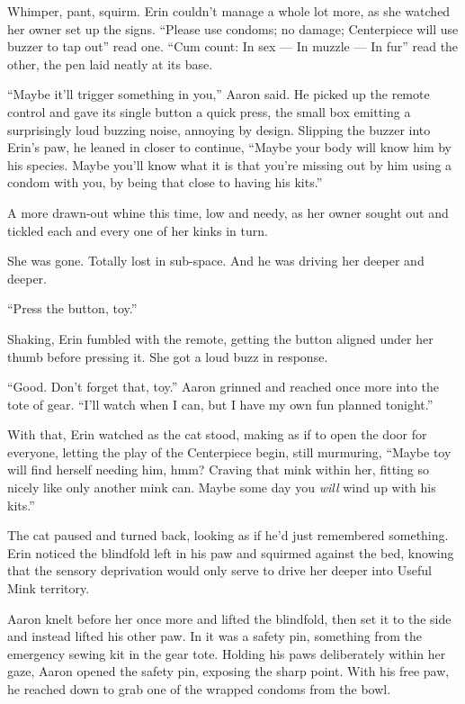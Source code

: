 Whimper, pant, squirm. Erin couldn't manage a whole lot more, as she
watched her owner set up the signs. ``Please use condoms; no damage;
Centerpiece will use buzzer to tap out'' read one. ``Cum count: In sex
--- In muzzle --- In fur'' read the other, the pen laid neatly at its
base.

``Maybe it'll trigger something in you,'' Aaron said. He picked up the
remote control and gave its single button a quick press, the small box
emitting a surprisingly loud buzzing noise, annoying by design. Slipping
the buzzer into Erin's paw, he leaned in closer to continue, ``Maybe
your body will know him by his species. Maybe you'll know what it is
that you're missing out by him using a condom with you, by being that
close to having his kits.''

A more drawn-out whine this time, low and needy, as her owner sought out
and tickled each and every one of her kinks in turn.

She was gone. Totally lost in sub-space. And he was driving her deeper
and deeper.

``Press the button, toy.''

Shaking, Erin fumbled with the remote, getting the button aligned under
her thumb before pressing it. She got a loud buzz in response.

``Good. Don't forget that, toy.'' Aaron grinned and reached once more
into the tote of gear. ``I'll watch when I can, but I have my own fun
planned tonight.''

With that, Erin watched as the cat stood, making as if to open the door
for everyone, letting the play of the Centerpiece begin, still
murmuring, ``Maybe toy will find herself needing him, hmm? Craving that
mink within her, fitting so nicely like only another mink can. Maybe
some day you \emph{will} wind up with his kits.''

The cat paused and turned back, looking as if he'd just remembered
something. Erin noticed the blindfold left in his paw and squirmed
against the bed, knowing that the sensory deprivation would only serve
to drive her deeper into Useful Mink territory.

Aaron knelt before her once more and lifted the blindfold, then set it
to the side and instead lifted his other paw. In it was a safety pin,
something from the emergency sewing kit in the gear tote. Holding his
paws deliberately within her gaze, Aaron opened the safety pin, exposing
the sharp point. With his free paw, he reached down to grab one of the
wrapped condoms from the bowl.

